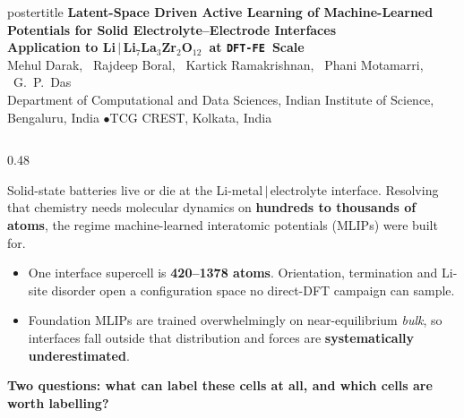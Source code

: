 \documentclass[serif,mathserif,final]{beamer}
\newcommand{\DFTFE}{\texttt{DFT-FE}}
\newcommand{\LLZO}{Li$_7$La$_3$Zr$_2$O$_{12}$}
\newcommand{\bad}[1]{\textcolor{accentred}{\textbf{#1}}}
\newcommand{\key}[1]{\textcolor{inkblue}{\textbf{#1}}}
\begin{document}

\begin{frame}[t]

\begin{beamercolorbox}[sep=0.6em,center,wd=\paperwidth]{postertitle}
  {\huge\textbf{Latent-Space Driven Active Learning of Machine-Learned
   Potentials for Solid Electrolyte--Electrode Interfaces}}\\[0.45em]
  {\LARGE\textbf{Application to Li\,$|$\,\LLZO\ at \DFTFE\ Scale}}\\[0.7em]
  {\Large Mehul Darak, \ Rajdeep Boral, \ Kartick Ramakrishnan, \
   Phani Motamarri, \ G.~P.~Das}\\[0.35em]
  {\large Department of Computational and Data Sciences, Indian Institute of
   Science, Bengaluru, India \quad$\bullet$\quad TCG CREST, Kolkata, India}
\end{beamercolorbox}
\vspace{0.35cm}

\begin{columns}[t]

\begin{column}{0.48\paperwidth}

\begin{tcolorbox}[posterbox,title=Motivation: the interface decides the battery]
\justifying
Solid-state batteries live or die at the Li-metal\,$|$\,electrolyte interface.
Resolving that chemistry needs molecular dynamics on \textbf{hundreds to
thousands of atoms}, the regime machine-learned interatomic potentials (MLIPs)
were built for.
\vspace{0.3em}
\begin{itemize}
  \item One interface supercell is \textbf{420--1378 atoms}. Orientation,
        termination and Li-site disorder open a configuration space no
        direct-DFT campaign can sample.
  \item Foundation MLIPs are trained overwhelmingly on near-equilibrium
        \emph{bulk}, so interfaces fall outside that distribution and forces
        are \bad{systematically underestimated}.
\end{itemize}
\vspace{0.2em}
\begin{center}\Large
\key{Two questions: what can label these cells at all, and which cells are
worth labelling?}
\end{center}
\end{tcolorbox}


\end{column}
\end{columns}
\end{frame}
\end{document}
